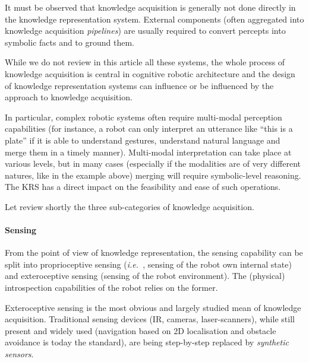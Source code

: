 \documentclass[a4paper, twocolumn]{article}
\newcommand{\ie}{{\textit{i.e.\ }}}
\begin{document}
It must be observed that knowledge acquisition is generally not done directly
in the knowledge representation system. External components (often aggregated
into knowledge acquisition \emph{pipelines}) are usually required to convert
percepts into symbolic facts and to ground them.

While we do not review in this article all these systems, the whole process of
knowledge acquisition is central in cognitive robotic architecture and the
design of knowledge representation systems can influence or be influenced by
the approach to knowledge acquisition.

In particular, complex robotic systems often require multi-modal perception
capabilities (for instance, a robot can only interpret an utterance like ``this
is a plate'' if it is able to understand gestures, understand natural language
and merge them in a timely manner). Multi-modal interpretation can take place
at various levels, but in many cases (especially if the modalities are of very
different natures, like in the example above) merging will require
symbolic-level reasoning. The KRS has a direct impact on the feasibility and
ease of such operations.

Let review shortly the three sub-categories of knowledge acquisition.

\begin{scriptsize}
\begin{center}
\end{center}
\end{scriptsize}

\paragraph{Sensing}

From the point of view of knowledge representation, the sensing capability can
be split into proprioceptive sensing (\ie, sensing of the robot own internal
state) and exteroceptive sensing (sensing of the robot environment). The
(physical) introspection capabilities of the robot relies on the former.

Exteroceptive sensing is the most obvious and largely studied mean of knowledge
acquisition. Traditional sensing devices (IR, cameras, laser-scanners), while
still present and widely used (navigation based on 2D localisation and obstacle
avoidance is today the standard), are being step-by-step replaced by
\emph{synthetic sensors}.
\end{document}
